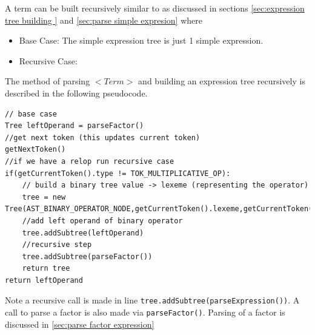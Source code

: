 A term  can be built recursively similar to as discussed in sections \ref{sec:expression tree building } and \ref{sec:parse simple expresion} where 
\begin{itemize}
	\item Base Case: The simple expression tree is just 1 simple expression.
	      \begin{center}
	      \end{center}
	\item Recursive Case:
	      \begin{center}
	      \end{center}
	      
\end{itemize}



The method of parsing $<Term>$ and building an expression tree recursively is described in the following pseudocode.
\begin{lstlisting}[caption=parsing \emph{<Term>} and building an expression tree (\emph{parseTerm()})]
// base case
Tree leftOperand = parseFactor()
//get next token (this updates current token) 
getNextToken()
//if we have a relop run recursive case
if(getCurrentToken().type != TOK_MULTIPLICATIVE_OP):
    // build a binary tree value -> lexeme (representing the operator)
    tree = new Tree(AST_BINARY_OPERATOR_NODE,getCurrentToken().lexeme,getCurrentToken().lineNumber)
    //add left operand of binary operator
    tree.addSubtree(leftOperand)
    //recursive step
    tree.addSubtree(parseFactor())
    return tree
return leftOperand
\end{lstlisting}
Note a recursive call is made in line \verb!tree.addSubtree(parseExpression())!. A call to parse a factor is also made via \verb!parseFactor()!. Parsing of a factor is discussed in \ref{sec:parse factor expression}

